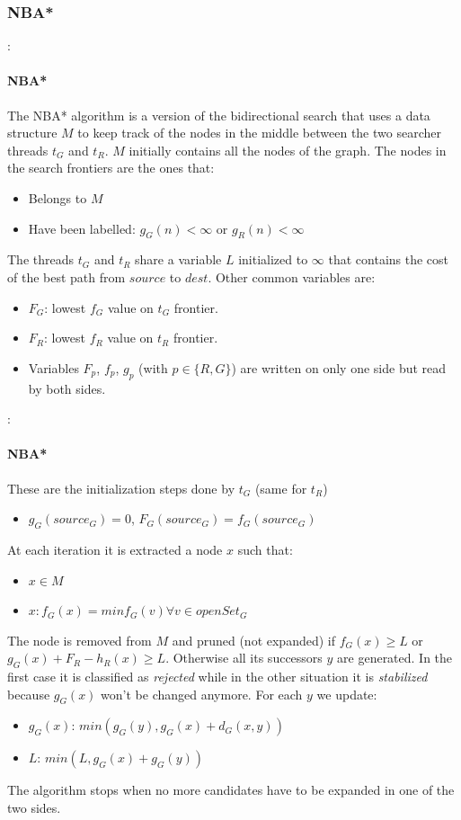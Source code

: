 \documentclass[12pt]{beamer}
\begin{document}
	\subsubsection{NBA*}
	\begin{frame}{\secname : \subsecname}
		\framesubtitle{NBA*}
		The NBA* algorithm is a version of  the bidirectional search that uses a data
		structure $M$ to keep track of the nodes in the middle between the two searcher
		threads $t_G$ and $t_R$. $M$ initially contains all the nodes of the graph. The nodes
		in the search frontiers are the ones that:
		\begin{itemize}
		\item Belongs to $M$
		\item Have been labelled: $g_G(n) < \infty $ or $g_R(n) < \infty $
		\end{itemize}
		The threads $t_G$ and $t_R$ share a variable $L$ initialized to $\infty$ that contains
		the cost of the best path from $source$ to $dest$. Other common variables are:
		\begin{itemize}
		\item $F_G$: lowest $f_G$ value on $t_G$ frontier.
		\item $F_R$: lowest $f_R$ value on $t_R$ frontier.
		\item Variables $F_p$, $f_p$, $g_p$ (with $p \in \{R,G\}$) are written on only one
				side but read by both sides.
		\end{itemize}
	\end{frame}
	\begin{frame}{\secname : \subsecname}
		\framesubtitle{NBA*}
		These are the initialization steps done by $t_G$ (same for $t_R$)
		\begin{itemize}
		\item $g_G(source_G)=0$, $F_G(source_G)=f_G(source_G)$
		\end{itemize}
		At each iteration it is extracted a node $x$ such that:
		\begin{itemize}
		\item $x \in M$
		\item $x: f_G(x) = min f_G(v) \forall v \in openSet_G$ 
		\end{itemize}
		The node is removed from $M$ and pruned (not expanded) if $f_G(x) \ge L$ or
		$g_G(x)+F_R-h_R(x) \ge L$. Otherwise all its successors $y$ are generated. In the
		first case it is classified as \textit{rejected} while in the other situation it is
		\textit{stabilized} because $g_G(x)$ won't be changed anymore. For each $y$ we update:
		\begin{itemize}
		\item $g_G(x)$: $min(g_G(y), g_G(x) + d_G(x, y))$
		\item $L$: $min(L, g_G(x) + g_G(y))$
		\end{itemize}
		The algorithm stops when no more candidates have to be expanded in one of the two sides.
	\end{frame}
\end{document}
